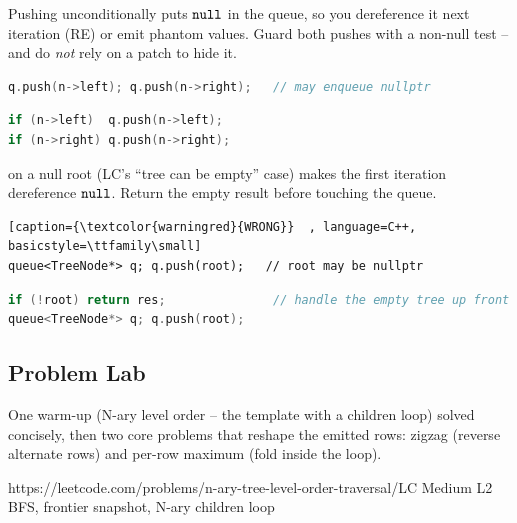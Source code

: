 \begin{warningbox}
Pushing  unconditionally puts $\texttt{null}$ in the queue, so you dereference it
next iteration (RE) or emit phantom values. Guard both pushes with a non-null test -- and
do \emph{not} rely on a  patch to hide it.
\end{warningbox}
\begin{lstlisting}[caption={\textcolor{warningred}{WRONG}: nulls pollute the frontier}, language=C++, basicstyle=\ttfamily\small]
q.push(n->left); q.push(n->right);   // may enqueue nullptr
\end{lstlisting}
\begin{lstlisting}[caption={\textcolor{successgreen}{RIGHT}: only real nodes enter the queue}, language=C++, basicstyle=\ttfamily\small]
if (n->left)  q.push(n->left);
if (n->right) q.push(n->right);
\end{lstlisting}

\begin{warningbox}
 on a null root (LC's ``tree can be empty'' case) makes the first
iteration dereference $\texttt{null}$. Return the empty result before touching the queue.
\end{warningbox}
\begin{lstlisting}[caption={\textcolor{warningred}{WRONG}}  , language=C++, basicstyle=\ttfamily\small]
queue<TreeNode*> q; q.push(root);   // root may be nullptr
\end{lstlisting}
\begin{lstlisting}[caption={\textcolor{successgreen}{RIGHT}}, language=C++, basicstyle=\ttfamily\small]
if (!root) return res;               // handle the empty tree up front
queue<TreeNode*> q; q.push(root);
\end{lstlisting}


\subsection{Problem Lab}

One  warm-up (N-ary level order -- the template with a children loop) solved
concisely, then two  core problems that reshape the emitted rows: zigzag
(reverse alternate rows) and per-row maximum (fold inside the loop).

  {https://leetcode.com/problems/n-ary-tree-level-order-traversal/}{LC Medium L2}
  {BFS, frontier snapshot, N-ary children loop}


